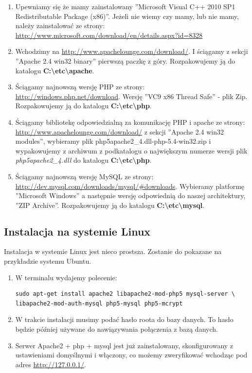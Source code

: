 \documentclass[a4paper,10pt]{article}
\begin{document}
\begin{enumerate}
	\item Upewniamy się że mamy zainstalowany ''Microsoft Visual C++ 2010 SP1 Redistributable Package (x86)''. Jeżeli nie wiemy czy mamy, lub nie mamy, należy zainstalować ze strony:\\ \href{http://www.microsoft.com/download/en/details.aspx?id=8328}{http://www.microsoft.com/download/en/details.aspx?id=8328}
	\item Wchodzimy na \href{http://www.apachelounge.com/download/}{http://www.apachelounge.com/download/}. I ściągamy z sekcji ''Apache 2.4 win32 binary''  pierwszą paczkę z góry. Rozpakowujemy ją do katalogu \textbf{C:\textbackslash etc\textbackslash apache}.
	\item Ściągamy najnowszą wersję PHP ze strony: \href{http://windows.php.net/download}{http://windows.php.net/download}. Wersję ''VC9 x86 Thread Safe'' - plik Zip. Rozpakowujemy ją do katalogu \textbf{C:\textbackslash etc\textbackslash php}.
	\item Ściągamy bibliotekę odpowiedzialną za komunikację PHP i apache ze strony: \\
\href{http://www.apachelounge.com/download/}{http://www.apachelounge.com/download/} z sekcji ''Apache 2.4 win32 modules'', wybieramy plik php5apache2\_4.dll-php-5.4-win32.zip i wypakowujemy z archiwum z podkatalogu o największym numerze wersji plik \textit{php5apache2\_4.dll} do katalogu \textbf{C:\textbackslash etc\textbackslash php}.
	\item Ściągamy najnowszą wersję MySQL ze strony:  \href{http://dev.mysql.com/downloads/mysql/\#downloads}{http://dev.mysql.com/downloads/mysql/\#downloads}. Wybieramy platformę ''Microsoft Windows'' a następnie wersję odpowiednią do naszej architektury, ''ZIP Archive''. Rozpakowujemy ją do katalogu \textbf{C:\textbackslash etc\textbackslash mysql}.
\end{enumerate}
\subsection{Instalacja na systemie Linux}
Instalacja w systemie Linux jest nieco prostsza. Zostanie do pokazane na przykładzie systemu Ubuntu.
\begin{enumerate}
\item W terminalu wydajemy polecenie:\\
\begin{verbatim}
sudo apt-get install apache2 libapache2-mod-php5 mysql-server \
libapache2-mod-auth-mysql php5-mysql php5-mcrypt
\end{verbatim}
\item W trakcie instalacji musimy podać hasło roota do bazy danych. To hasło będzie później używane do nawiązywania połączenia z bazą danych.
\item Serwer Apache2 + php + mysql jest już zainstalowany, skonfigurowany z ustawieniami domyślnymi i włączony, co możemy zweryfikować wchodząc pod adres \href{http://127.0.0.1/}{http://127.0.0.1/}.
\end{enumerate}
\end{document}

